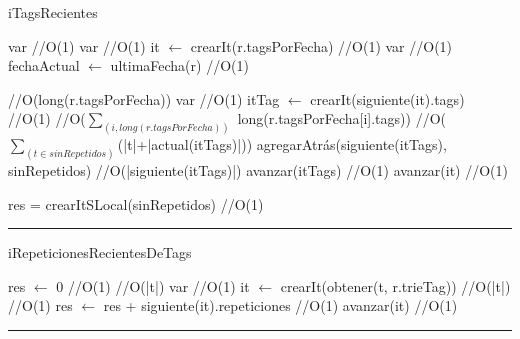 \begin{algorithm}[H]
\caption{iTagsRecientes}
\begin{algorithmic}[1]
\state var \hfill//O(1)
\state var \hfill//O(1)
\state it $\gets$ crearIt(r.tagsPorFecha) \hfill//O(1)
\state var  \hfill//O(1)
\state fechaActual $\gets$ ultimaFecha(r) \hfill//O(1)

 \hfill//O(long(r.tagsPorFecha))
\state var \hfill//O(1)
\state itTag $\gets$ crearIt(siguiente(it).tags) \hfill//O(1)
 \hfill//O($\sum_{(i,long(r.tagsPorFecha))}$ long(r.tagsPorFecha[i].tags))
 \hfill//O($\sum_{(t \in sinRepetidos)}$(|t|+|actual(itTags)|))
\state agregarAtrás(siguiente(itTags), sinRepetidos) \hfill//O(|siguiente(itTags)|)
\endif %
\state avanzar(itTags) \hfill//O(1)
\endwhile %
\state avanzar(it) \hfill//O(1)
\endwhile %

\state res = crearItSLocal(sinRepetidos) \hfill//O(1)
\EndFunction 
\end{algorithmic}
\hrule
{}
\end{algorithm}


\begin{algorithm}[H]
\caption{iRepeticionesRecientesDeTags}
\begin{algorithmic}[1]
\state res $\gets$ 0 \hfill//O(1)
 \hfill//O(|t|)
\state var  \hfill//O(1)
\state it $\gets$ crearIt(obtener(t, r.trieTag)) \hfill//O(|t|)
 \hfill//O(1)
\state res $\gets$ res + siguiente(it).repeticiones \hfill//O(1)
\state avanzar(it) \hfill//O(1)
\endwhile
\endif
\EndFunction 
\end{algorithmic}
\hrule
{}
\end{algorithm}

